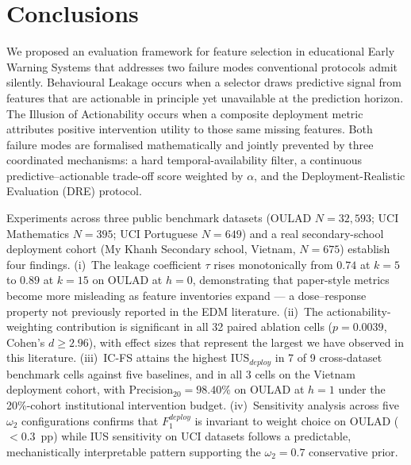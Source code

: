 \documentclass[a4paper,fleqn]{cas-sc}
\begin{document}

\section{Conclusions}
\label{sec:conclusions}

We proposed an evaluation framework for feature selection in educational Early Warning Systems that addresses two failure modes conventional protocols admit silently.
Behavioural Leakage occurs when a selector draws predictive signal from features that are actionable in principle yet unavailable at the prediction horizon. The Illusion of Actionability occurs when a composite deployment metric attributes positive intervention utility to those same missing features. 
Both failure modes are formalised mathematically and jointly prevented by three coordinated mechanisms: a hard temporal-availability filter, a continuous predictive--actionable trade-off score weighted by $\alpha$, and the Deployment-Realistic Evaluation (DRE) protocol.

Experiments across three public benchmark datasets (OULAD $N{=}32{,}593$; UCI Mathematics $N{=}395$; UCI Portuguese $N{=}649$) and a real secondary-school deployment cohort (My Khanh Secondary school, Vietnam, $N{=}675$) establish four findings. (i)~The leakage coefficient $\tau$ rises monotonically from $0.74$ at $k=5$ to $0.89$ at $k=15$ on OULAD at $h=0$, demonstrating that paper-style metrics become more misleading as feature inventories expand --- a dose--response property not previously reported in the EDM literature. (ii)~The actionability-weighting contribution is significant in all 32 paired ablation cells ($p = 0.0039$, Cohen's $d \geq 2.96$), with effect sizes that represent the largest we have observed in this literature. (iii)~IC-FS attains the highest $\mathrm{IUS}_{deploy}$ in 7 of 9 cross-dataset benchmark cells against five baselines, and in all 3 cells on the Vietnam deployment cohort, with $\mathrm{Precision}_{20} = 98.40\%$ on OULAD at $h=1$ under the 20\%-cohort institutional intervention budget. (iv)~Sensitivity analysis across five $\omega_2$ configurations confirms that $F^{deploy}_1$ is invariant to weight choice on OULAD ($<0.3$~pp) while IUS sensitivity on UCI datasets follows a predictable, mechanistically interpretable pattern supporting the $\omega_2 = 0.7$ conservative prior.
\end{document}
